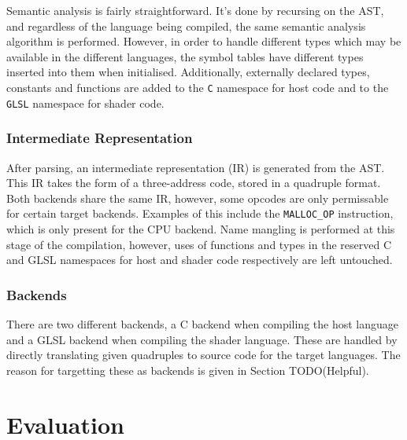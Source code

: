 \documentclass[a4paper,12pt,twoside,openright]{report}
\begin{document}
Semantic analysis is fairly straightforward. It's done by recursing on the AST,
and regardless of the language being compiled, the same semantic analysis
algorithm is performed. However, in order to handle different types which may
be available in the different languages, the symbol tables have different types
inserted into them when initialised. Additionally, externally declared types,
constants and functions are added to the \texttt{C} namespace for host code and
to the \texttt{GLSL} namespace for shader code.

\subsection{Intermediate Representation}

After parsing, an intermediate representation (IR) is generated from the AST.
This IR takes the form of a three-address code, stored in a quadruple format.
Both backends share the same IR, however, some opcodes are only permissable for
certain target backends. Examples of this include the \texttt{MALLOC\_OP}
instruction, which is only present for the CPU backend. Name mangling is
performed at this stage of the compilation, however, uses of functions and
types in the reserved C and GLSL namespaces for host and shader code
respectively are left untouched.

\subsection{Backends}

There are two different backends, a C backend when compiling the host language
and a GLSL backend when compiling the shader language. These are handled by
directly translating given quadruples to source code for the target languages.
The reason for targetting these as backends is given in Section TODO(Helpful).




\chapter{Evaluation}

\end{document}
